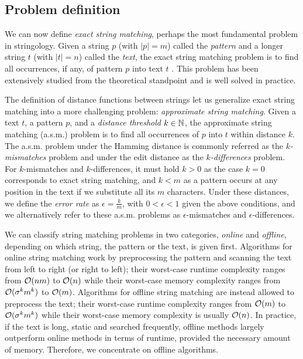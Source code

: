 \subsection{Problem definition}

We can now define \emph{exact string matching}, perhaps the most fundamental problem in stringology.
Given a string $p$ (with $|p|=m$) called the \emph{pattern} and a longer string $t$ (with $|t|=n$) called the \emph{text}, the exact string matching problem is to find all occurrences, if any, of pattern $p$ into text $t$ \cite{Gusfield1997}.
This problem has been extensively studied from the theoretical standpoint and is well solved in practice.

The definition of distance functions between strings let us generalize exact string matching into a more challenging problem: \emph{approximate string matching}.
Given a text $t$, a pattern $p$, and a \emph{distance threshold} $k \in \mathbb {N}$, the approximate string matching (a.s.m.) problem is to find all occurrences of $p$ into $t$ within distance $k$.
The a.s.m. problem under the Hamming distance is commonly referred as the \emph{$k$-mismatches} problem and under the edit distance as the \emph{$k$-differences} problem.
For $k$-mismatches and $k$-differences, it must hold $k > 0$ as the case $k = 0$ corresponds to exact string matching, and $k < m$ as a pattern occurs at any position in the text if we substitute all its $m$ characters.
Under these distances, we define the \emph{error rate} as $\epsilon = \frac{k}{m}$, with $0 < \epsilon < 1$ given the above conditions, and we alternatively refer to these a.s.m. problems as $\epsilon$-mismatches and $\epsilon$-differences.

We can classify string matching problems in two categories, \emph{online} and \emph{offline}, depending on which string, the pattern or the text, is given first.
Algorithms for online string matching work by preprocessing the pattern and scanning the text from left to right (or right to left); their worst-case runtime complexity ranges from $\mathcal{O}(nm)$ to $\mathcal{O}(n)$ while their worst-case memory complexity ranges from $\mathcal{O}(\sigma^k m^k)$ to $\mathcal{O}(m)$.
Algorithms for offline string matching are instead allowed to preprocess the text; their worst-case runtime complexity ranges from $\mathcal{O}(m)$ to $\mathcal{O}(\sigma^k m^k)$ while their worst-case memory complexity is usually $\mathcal{O}(n)$.
In practice, if the text is long, static and searched frequently, offline methods largely outperform online methods in terms of runtime, provided the necessary amount of memory. Therefore, we concentrate on offline algorithms.


